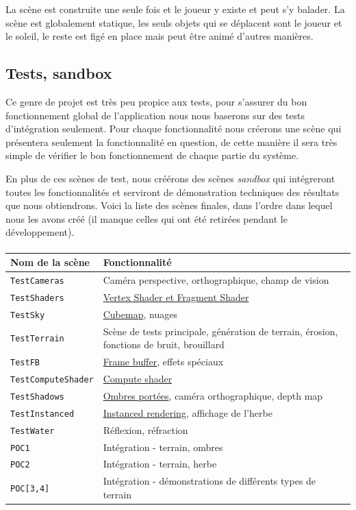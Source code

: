 \documentclass[11pt]{article} %
\newcommand{\code}{\texttt}
\begin{document}

La scène est construite une seule fois et le joueur y existe et peut s'y balader. La scène est globalement statique, les seuls objets qui se déplacent sont le joueur et le soleil, le reste est figé en place mais peut être animé d'autres manières.

\subsection{Tests, sandbox}

Ce genre de projet est très peu propice aux tests, pour s'assurer du bon fonctionnement global de l'application nous nous baserons sur des tests d'intégration seulement. Pour chaque fonctionnalité nous créerons une scène qui présentera seulement la fonctionnalité en question, de cette manière il sera très simple de vérifier le bon fonctionnement de chaque partie du système.

En plus de ces scènes de test, nous créérons des scènes \textit{sandbox} qui intégreront toutes les fonctionnalités et serviront de démonstration techniques des résultats que nous obtiendrons. Voici la liste des scènes finales, dans l'ordre dans lequel nous les avons créé (il manque celles qui ont été retirées pendant le développement).

\paragraph{}
\begin{tabular}{|l|l|}
	\hline
	Nom de la scène & Fonctionnalité \\\hline\hline
	\code{TestCameras} & Caméra perspective, orthographique, champ de vision\\\hline
	\code{TestShaders} & \hyperref[sec:shaders]{Vertex Shader et Fragment Shader}\\\hline
	\code{TestSky} & \hyperref[sec:sky]{Cubemap}, nuages\\\hline
	\code{TestTerrain} & \makecell[l]{Scène de tests principale, génération de terrain, érosion,\\ fonctions de bruit, brouillard}\\\hline
	\code{TestFB} & \hyperref[sec:framebuffers]{Frame buffer}, effets spéciaux\\\hline
	\code{TestComputeShader} & \hyperref[sec:shaders]{Compute shader}\\\hline
	\code{TestShadows} & \hyperref[sec:casted_shadows]{Ombres portées}, caméra orthographique, depth map\\\hline
	\code{TestInstanced} & \hyperref[sec:instanced_rendering]{Instanced rendering}, affichage de l'herbe\\\hline
	\code{TestWater} & Réflexion, réfraction\\\hline
	\code{POC1} & Intégration - terrain, ombres\\\hline
	\code{POC2} & Intégration - terrain, herbe\\\hline
	\code{POC[3,4]} & Intégration - démonstrations de différents types de terrain\\\hline
\end{tabular}
\end{document}

